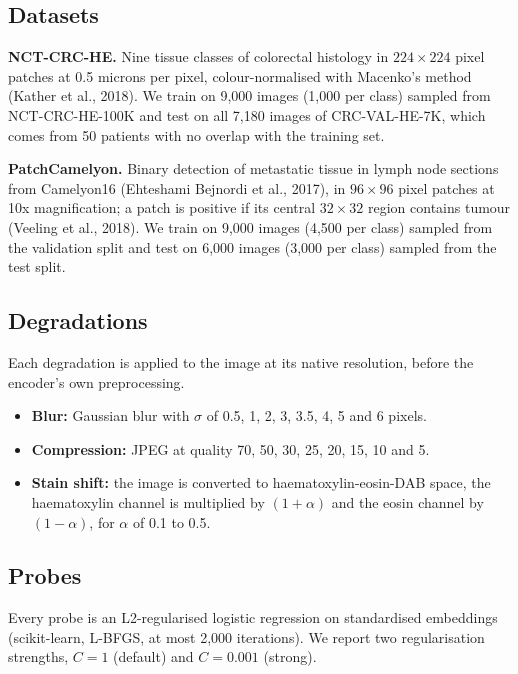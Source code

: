 \documentclass[11pt,a4paper]{article}
\begin{document}
\subsection{Datasets}

\textbf{NCT-CRC-HE.} Nine tissue classes of colorectal histology in $224 \times 224$ pixel patches at 0.5 microns per pixel, colour-normalised with Macenko's method (Kather et al., 2018). We train on 9,000 images (1,000 per class) sampled from NCT-CRC-HE-100K and test on all 7,180 images of CRC-VAL-HE-7K, which comes from 50 patients with no overlap with the training set.

\textbf{PatchCamelyon.} Binary detection of metastatic tissue in lymph node sections from Camelyon16 (Ehteshami Bejnordi et al., 2017), in $96 \times 96$ pixel patches at 10x magnification; a patch is positive if its central $32 \times 32$ region contains tumour (Veeling et al., 2018). We train on 9,000 images (4,500 per class) sampled from the validation split and test on 6,000 images (3,000 per class) sampled from the test split.

\subsection{Degradations}

Each degradation is applied to the image at its native resolution, before the encoder's own preprocessing.

\begin{itemize}
\item \textbf{Blur:} Gaussian blur with $\sigma$ of 0.5, 1, 2, 3, 3.5, 4, 5 and 6 pixels.
\item \textbf{Compression:} JPEG at quality 70, 50, 30, 25, 20, 15, 10 and 5.
\item \textbf{Stain shift:} the image is converted to haematoxylin-eosin-DAB space, the haematoxylin channel is multiplied by $(1+\alpha)$ and the eosin channel by $(1-\alpha)$, for $\alpha$ of 0.1 to 0.5.
\end{itemize}

\subsection{Probes}

Every probe is an L2-regularised logistic regression on standardised embeddings (scikit-learn, L-BFGS, at most 2,000 iterations). We report two regularisation strengths, $C = 1$ (default) and $C = 0.001$ (strong).
\end{document}
